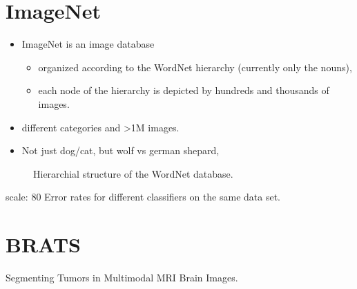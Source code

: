 \documentclass[letterpaper,10pt,english]{sphinxmanual}
\begin{document}
\section{ImageNet}
\label{\detokenize{03-Datasets:imagenet}}\begin{itemize}
\item {} 
\sphinxAtStartPar
ImageNet is an image database
\begin{itemize}
\item {} 
\sphinxAtStartPar
organized according to the WordNet hierarchy (currently only the nouns),

\item {} 
\sphinxAtStartPar
each node of the hierarchy is depicted by hundreds and thousands of images.

\end{itemize}

\item {} 
 different categories and \textgreater{}1M images.

\item {} 
\sphinxAtStartPar
Not just dog/cat, but wolf vs german shepard,

\end{itemize}

\begin{figure}[htbp]
\centering
\capstart

\noindent{}
\caption{Hierarchial structure of the WordNet database.}\label{\detokenize{03-Datasets:id7}}\end{figure}

\begin{sphinxVerbatim}[commandchars=\\\{\}]
\PYGZhy{}\PYGZhy{}\PYGZhy{}
scale: 80\PYGZpc{}
\PYGZhy{}\PYGZhy{}\PYGZhy{}
Error rates for different classifiers on the same data set.
\end{sphinxVerbatim}



\sphinxAtStartPar
{}




\section{BRATS}
\label{\detokenize{03-Datasets:brats}}
\sphinxAtStartPar
Segmenting Tumors in Multimodal MRI Brain Images.
\end{document}
